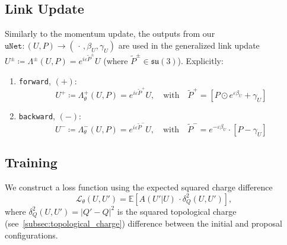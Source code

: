 \documentclass[a4paper,11pt]{article}
\begin{document}
\subsection{\label{subsec:gauge-update}Link Update}
%
Similarly to the momentum update, the outputs from our 
%
$\texttt{uNet}: (U, P) \rightarrow \left(\, \cdot\,, \beta_{U}, \gamma_{U}\right)$
%
are used in the generalized link update $U^{\pm} \coloneqq \Lambda^{\pm}(U, P) = e^{i\varepsilon \tilde{P}^{\pm}} U$
%
%
(where $\tilde{P}^{\pm} \in \mathfrak{su(3)}$).
%
Explicitly:
%
\begin{enumerate}
\item \texttt{forward}, $(+)$:
    \begin{equation}
        U^{+} \coloneqq \Lambda^{+}_{\theta}(U, P) = e^{i\varepsilon \tilde{P}^{+}} U, \quad \text{with}\quad \tilde{P}^{+} = \left[P\odot e^{\varepsilon \beta_{U}} + \gamma_{U}\right]
    \end{equation}
%
\item \texttt{backward}, $(-)$:
%
    \begin{equation}
        U^{-} \coloneqq \Lambda^{-}_{\theta}(U, P) = e^{i\varepsilon \tilde{P}^{-}} U, \quad \text{with}\quad \tilde{P}^{-} = e^{-\varepsilon \beta_{U}} \cdot \left[P - \gamma_{U} \right] 
    \end{equation}
%
\end{enumerate}
%
\subsection{\label{subsec:training}Training}
%
We construct a loss function using the expected squared charge
difference
%
\begin{equation}
    \mathcal{L}_{\theta}(U, U') = \mathbb{E}\left[A(U'|U)\,\cdot \delta^{2}_{Q}(U, U')\right],
\end{equation}
%
where $\delta^{2}_{Q}(U, U')= |Q' - Q|^{2}$ is the squared topological
charge (see~\ref{subsec:topological_charge}) difference between the initial and proposal configurations.
\end{document}
